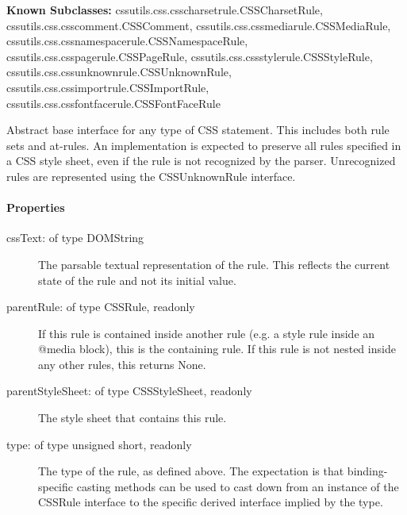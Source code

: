 \textbf{Known Subclasses:}
cssutils.css.csscharsetrule.CSSCharsetRule,
    cssutils.css.csscomment.CSSComment,
    cssutils.css.cssmediarule.CSSMediaRule,
    cssutils.css.cssnamespacerule.CSSNamespaceRule,
    cssutils.css.csspagerule.CSSPageRule,
    cssutils.css.cssstylerule.CSSStyleRule,
    cssutils.css.cssunknownrule.CSSUnknownRule,
    cssutils.css.cssimportrule.CSSImportRule,
    cssutils.css.cssfontfacerule.CSSFontFaceRule


Abstract base interface for any type of CSS statement. This includes
both rule sets and at-rules. An implementation is expected to preserve
all rules specified in a CSS style sheet, even if the rule is not
recognized by the parser. Unrecognized rules are represented using the
CSSUnknownRule interface.



\hypertarget{properties}{}
\paragraph*{Properties}
\label{properties}
\begin{description}
\item[{cssText: of type DOMString}] \leavevmode 
The parsable textual representation of the rule. This reflects the
current state of the rule and not its initial value.

\item[{parentRule: of type CSSRule, readonly}] \leavevmode 
If this rule is contained inside another rule (e.g. a style rule
inside an @media block), this is the containing rule. If this rule
is not nested inside any other rules, this returns None.

\item[{parentStyleSheet: of type CSSStyleSheet, readonly}] \leavevmode 
The style sheet that contains this rule.

\item[{type: of type unsigned short, readonly}] \leavevmode 
The type of the rule, as defined above. The expectation is that
binding-specific casting methods can be used to cast down from an
instance of the CSSRule interface to the specific derived interface
implied by the type.

\end{description}



